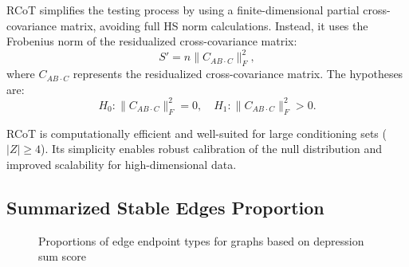 \documentclass[
]{article}
\begin{document}
RCoT simplifies the testing process by using a finite-dimensional
partial cross-covariance matrix, avoiding full HS norm calculations.
Instead, it uses the Frobenius norm of the residualized cross-covariance
matrix: \[
S' = n \|C_{AB \cdot C}\|_F^2,
\] where \(C_{AB \cdot C}\) represents the residualized cross-covariance
matrix. The hypotheses are: \[
H_0: \|C_{AB \cdot C}\|_F^2 = 0, \quad H_1: \|C_{AB \cdot C}\|_F^2 > 0.
\]

RCoT is computationally efficient and well-suited for large conditioning
sets (\(|Z| \geq 4\)). Its simplicity enables robust calibration of the
null distribution and improved scalability for high-dimensional data.

\subsection{Summarized Stable Edges Proportion}\label{sec-propmatrix}

\begin{figure}


\caption{\label{fig-sum-mat}Proportions of edge endpoint types for
graphs based on depression sum score}

\end{figure}%
\end{document}

